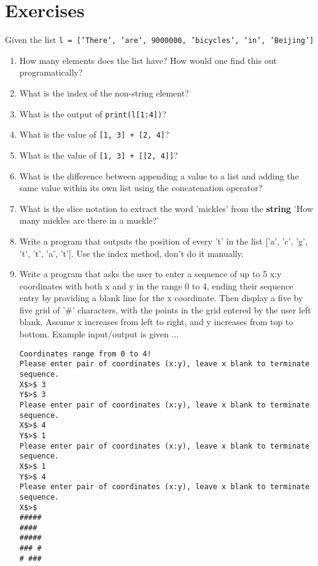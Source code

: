 \section{Exercises}

Given the list 
\texttt{l = ['There', 'are', 9000000, 'bicycles', 'in', 'Beijing']}
\begin{enumerate}
	\item How many elements does the list have? How would one find this    out programatically?
	\item What is the index of the non-string element?
	\item What is the output of 
\texttt{print(l[1:4])}?
	\item What is the value of 
\texttt{[1, 3] + [2, 4]}?
	\item What is the value of 
\texttt{[1, 3] + [[2, 4]]}?
	\item What is the difference between appending a value to a list and    adding the same value within its own list using the concatenation    operator?
	\item What is the slice notation to extract the word 'mickles' from    the \textbf{string} 'How many mickles are there in a    muckle?'
% 
% 
% 
% 

	\item Write a program that outputs the position of every 't' in the    list ['a', 'c', 'g', 't', 't', 'a', 't']. Use the index method,    don't do it manually.
	\item Write a program that asks the user to enter a sequence of up to    5 x:y coordinates with both x and y in the range 0 to 4, ending    their sequence entry by providing a blank line for the x    coordinate. Then display a five by five grid of '\#' characters,    with the points in the grid entered by the user left blank. Assume    x increases from left to right, and y increases from top to bottom.    Example input/output is given ...          
\begin{lstlisting}
Coordinates range from 0 to 4!
Please enter pair of coordinates (x:y), leave x blank to terminate sequence.
X$>$ 3
Y$>$ 3
Please enter pair of coordinates (x:y), leave x blank to terminate sequence.
X$>$ 4
Y$>$ 1
Please enter pair of coordinates (x:y), leave x blank to terminate sequence.
X$>$ 1
Y$>$ 4
Please enter pair of coordinates (x:y), leave x blank to terminate sequence.
X$>$
#####
#### 
#####
### #
# ###
\end{lstlisting}
\end{enumerate}
